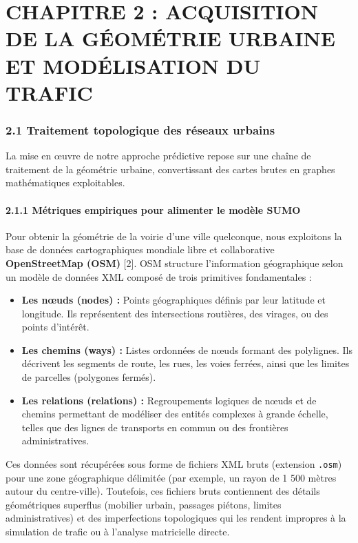 \documentclass[10pt, a4paper]{article}
\providecommand{\tightlist}{}
\begin{document}
\newpage

\section{CHAPITRE 2 : ACQUISITION DE LA GÉOMÉTRIE URBAINE ET
MODÉLISATION DU
TRAFIC}\label{chapitre-2-acquisition-de-la-guxe9omuxe9trie-urbaine-et-moduxe9lisation-du-trafic}

\subsubsection{2.1 Traitement topologique des réseaux
urbains}\label{traitement-topologique-des-ruxe9seaux-urbains}

La mise en œuvre de notre approche prédictive repose sur une chaîne de
traitement de la géométrie urbaine, convertissant des cartes brutes en
graphes mathématiques exploitables.

\paragraph{2.1.1 Métriques empiriques pour alimenter le modèle
SUMO}\label{muxe9triques-empiriques-pour-alimenter-le-moduxe8le-sumo}

Pour obtenir la géométrie de la voirie d'une ville quelconque, nous
exploitons la base de données cartographiques mondiale libre et
collaborative \textbf{OpenStreetMap (OSM)} {[}2{]}. OSM structure
l'information géographique selon un modèle de données XML composé de
trois primitives fondamentales :

\begin{itemize}
\tightlist
\item
  \textbf{Les nœuds (nodes) :} Points géographiques définis par leur
  latitude et longitude. Ils représentent des intersections routières,
  des virages, ou des points d'intérêt.
\item
  \textbf{Les chemins (ways) :} Listes ordonnées de nœuds formant des
  polylignes. Ils décrivent les segments de route, les rues, les voies
  ferrées, ainsi que les limites de parcelles (polygones fermés).
\item
  \textbf{Les relations (relations) :} Regroupements logiques de nœuds
  et de chemins permettant de modéliser des entités complexes à grande
  échelle, telles que des lignes de transports en commun ou des
  frontières administratives.
\end{itemize}

Ces données sont récupérées sous forme de fichiers XML bruts (extension
\texttt{.osm}) pour une zone géographique délimitée (par exemple, un
rayon de 1 500 mètres autour du centre-ville). Toutefois, ces fichiers
bruts contiennent des détails géométriques superflus (mobilier urbain,
passages piétons, limites administratives) et des imperfections
topologiques qui les rendent impropres à la simulation de trafic ou à
l'analyse matricielle directe.
\end{document}
